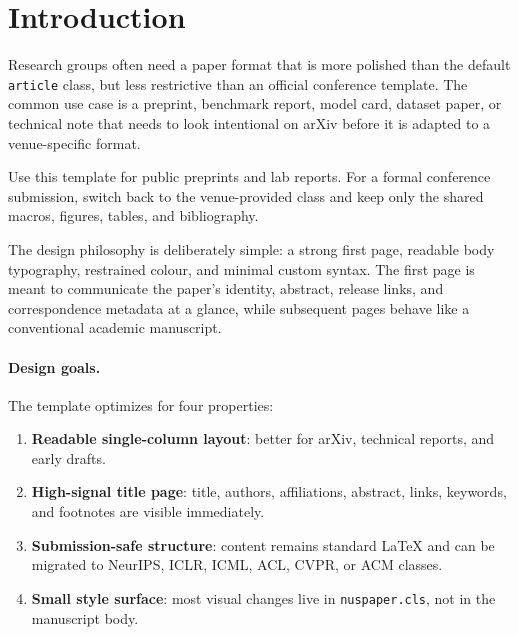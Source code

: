 \section{Introduction}

Research groups often need a paper format that is more polished than the default \texttt{article} class, but less restrictive than an official conference template. The common use case is a preprint, benchmark report, model card, dataset paper, or technical note that needs to look intentional on arXiv before it is adapted to a venue-specific format.

\begin{takeawaybox}
Use this template for public preprints and lab reports. For a formal conference submission, switch back to the venue-provided class and keep only the shared macros, figures, tables, and bibliography.
\end{takeawaybox}

The design philosophy is deliberately simple: a strong first page, readable body typography, restrained colour, and minimal custom syntax. The first page is meant to communicate the paper's identity, abstract, release links, and correspondence metadata at a glance, while subsequent pages behave like a conventional academic manuscript.

\paragraph{Design goals.}
The template optimizes for four properties:
\begin{enumerate}
  \item \textbf{Readable single-column layout}: better for arXiv, technical reports, and early drafts.
  \item \textbf{High-signal title page}: title, authors, affiliations, abstract, links, keywords, and footnotes are visible immediately.
  \item \textbf{Submission-safe structure}: content remains standard LaTeX and can be migrated to NeurIPS, ICLR, ICML, ACL, CVPR, or ACM classes.
  \item \textbf{Small style surface}: most visual changes live in \texttt{nuspaper.cls}, not in the manuscript body.
\end{enumerate}
